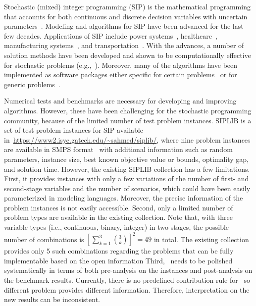 Stochastic (mixed) integer programming (SIP) is the mathematical programming that accounts for 
both continuous and discrete decision variables with uncertain parameters~\cite{book:BL2011}. 
Modeling and algorithms for SIP have been advanced for the last few decades. Applications of SIP include power systems~\cite{?}, healthcare~\cite{?}, manufacturing systems~\cite{?}, and transportation~\cite{?}. With the advances, a number of solution methods have been developed and shown to be computationally effective for stochastic problems (e.g.,~\cite{?}). Moreover, many of the algorithms have been implemented as software packages either specific for certain problems~\cite{?} or for generic problems~\cite{?}.

Numerical tests and benchmarks are necessary for developing and improving algorithms. However,
these have been challenging for the stochastic programming community, because of the limited number of test problem instances. 
SIPLIB is a set of test problem instances for SIP available in~\url{https://www2.isye.gatech.edu/~sahmed/siplib/}, where nine problem instances are available in SMPS format~\cite{?} with additional information such as random parameters, 
instance size, best known objective value or bounds, optimality gap, and solution time.  
However, the existing SIPLIB collection has a few limitations. 
First, it provides instances with only a few variations of the number of first- and second-stage variables and the number of scenarios, which could have been easily parameterized in 
modeling languages. Moreover, the precise information of the problem instances is 
not easily accessible. Second, only a limited number of problem types are available in 
the existing collection. Note that, with three variable types (i.e., continuous, 
binary, integer) in two stages, the possible number of combinations is $\left[\sum_{k=1}
^3\binom{3}{k}\right]^2=49$ in total. 
The existing collection provides only 5 such combinations 
regarding the problems that can be fully implementable based on the open information 
Third, \siplib\ needs to be polished systematically in terms of both pre-analysis on the 
instances and post-analysis on the benchmark results. Currently, there is no predefined 
contribution rule for \siplib\ so different problem provides different information. 
Therefore, interpretation on the new results can be inconsistent.


